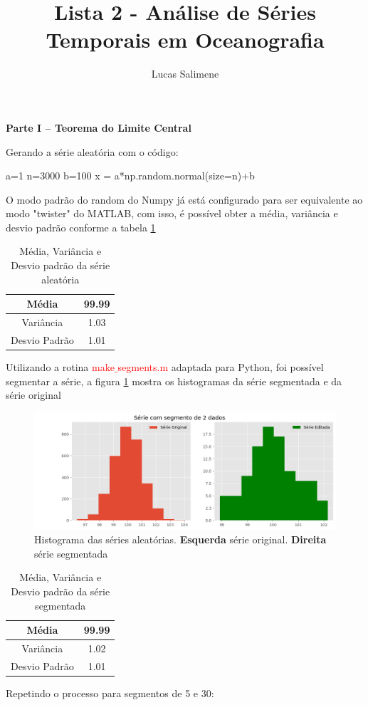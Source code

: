 \documentclass[12pt,a4paper,portuguese]{article}
\title{Lista 2 - Análise de Séries Temporais em Oceanografia}
\author{Lucas Salimene}
\date{}
\begin{document}
	\maketitle
	\newpage
	\textbf{Parte I – Teorema do Limite Central}
	
	Gerando a série aleatória com o código:
	\begin{python}
a=1
n=3000
b=100
x = a*np.random.normal(size=n)+b
	\end{python}
O modo padrão do random do Numpy já está configurado para ser equivalente ao modo "twister" do MATLAB, com isso, é possível obter a média, variância e desvio padrão conforme a tabela \ref{xmvstd}
\begin{table}[H]
\centering
\begin{tabular}{|c|c|}
	\hline
	Média & 99.99 \\
	\hline
	Variância & 1.03 \\
	\hline
	Desvio Padrão & 1.01 \\
	\hline
\end{tabular}
\caption{Média, Variância e Desvio padrão da série aleatória}
\label{xmvstd}
\end{table}
Utilizando a rotina \textcolor{red}{make$\_$segments.m} adaptada para Python, foi possível segmentar a série, a figura \ref{fig:lista2-1c} mostra os histogramas da série segmentada e da série original
\begin{figure}[H]
	\centering
	\includegraphics[width=0.9\linewidth]{lista2-1c}
	\caption{Histograma das séries aleatórias. \textbf{Esquerda} série original. \textbf{Direita} série segmentada}
	\label{fig:lista2-1c}
\end{figure}
	\begin{table}[H]
		\centering
		\begin{tabular}{|c|c|}
			\hline
			Média & 99.99 \\
			\hline
			Variância & 1.02 \\
			\hline
			Desvio Padrão & 1.01 \\
			\hline
		\end{tabular}
		\caption{Média, Variância e Desvio padrão da série segmentada}
		\label{y2}
	\end{table}
Repetindo o processo para segmentos de 5 e 30:
\end{document}
